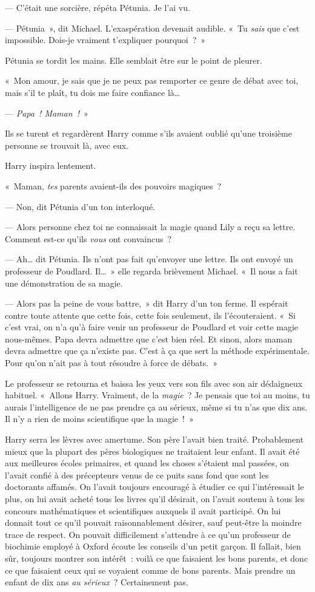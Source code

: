 --- C'était une sorcière, répéta Pétunia. Je l'ai vu.

--- Pétunia~», dit Michael. L'exaspération devenait audible. «~Tu \emph{sais} que c'est impossible. Dois-je vraiment t'expliquer pourquoi~?~»

Pétunia se tordit les mains. Elle semblait être sur le point de pleurer.

«~Mon amour, je sais que je ne peux pas remporter ce genre de débat avec toi, mais s'il te plaît, tu dois me faire confiance là…

--- \emph{Papa~! Maman~!}~»

Ils se turent et regardèrent Harry comme s'ils avaient oublié qu'une troisième personne se trouvait là, avec eux.

Harry inspira lentement.

«~Maman, \emph{tes} parents avaient-ils des pouvoirs magiques~?

--- Non, dit Pétunia d'un ton interloqué.

--- Alors personne chez toi ne connaissait la magie quand Lily a reçu sa lettre. Comment est-ce qu'ils \emph{vous} ont convaincus~?

--- Ah… dit Pétunia. Ils n'ont pas fait qu'envoyer une lettre. Ils ont envoyé un professeur de Poudlard. Il…~» elle regarda brièvement Michael. «~Il nous a fait une démonstration de sa magie.

--- Alors pas la peine de vous battre,~» dit Harry d'un ton ferme. Il espérait contre toute attente que cette fois, cette fois seulement, ils l'écouteraient. «~Si c'est vrai, on n'a qu'à faire venir un professeur de Poudlard et voir cette magie nous-mêmes. Papa devra admettre que c'est bien réel. Et sinon, alors maman devra admettre que ça n'existe pas. C'est à ça que sert la méthode expérimentale. Pour qu'on n'ait pas à tout résoudre à force de débats.~»

Le professeur se retourna et baissa les yeux vers son fils avec son air dédaigneux habituel. «~Allons Harry. Vraiment, de la \emph{magie}~? Je pensais que toi au moins, tu aurais l'intelligence de ne pas prendre ça au sérieux, même si tu n'as que dix ans. Il n'y a rien de moins scientifique que la magie~!~»

Harry serra les lèvres avec amertume. Son père l'avait bien traité. Probablement mieux que la plupart des pères biologiques ne traitaient leur enfant. Il avait été aux meilleures écoles primaires, et quand les choses s'étaient mal passées, on l'avait confié à des précepteurs venus de ce puits sans fond que sont les doctorants affamés. On l'avait toujours encouragé à étudier ce qui l'intéressait le plus, on lui avait acheté tous les livres qu'il désirait, on l'avait soutenu à tous les concours mathématiques et scientifiques auxquels il avait participé. On lui donnait tout ce qu'il pouvait raisonnablement désirer, sauf peut-être la moindre trace de respect. On pouvait difficilement s'attendre à ce qu'un professeur de biochimie employé à Oxford écoute les conseils d'un petit garçon. Il fallait, bien sûr, toujours montrer son intérêt~: voilà ce que faisaient les bons parents, et donc ce que faisaient ceux qui se voyaient comme de bons parents. Mais prendre un enfant de dix ans \emph{au sérieux}~? Certainement pas.

